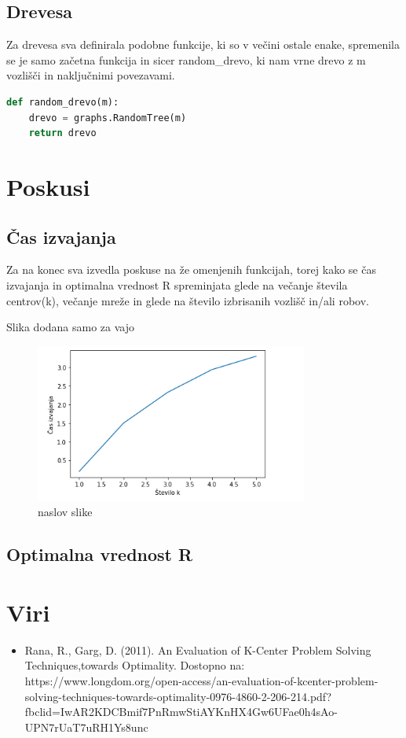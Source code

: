 \documentclass[a4paper]{article}
\begin{document}
\subsection{Drevesa}
Za drevesa sva definirala podobne funkcije, ki so v večini ostale enake, spremenila se je samo začetna funkcija in sicer random\_drevo, ki nam vrne drevo z m vozlišči in naključnimi povezavami.
\begin{lstlisting}[language=Python]
def random_drevo(m):
    drevo = graphs.RandomTree(m)
    return drevo
\end{lstlisting}

\section{Poskusi}
\subsection{Čas izvajanja}
Za na konec sva izvedla poskuse na že omenjenih funkcijah, torej kako se čas izvajanja in optimalna vrednost R spreminjata glede na večanje števila centrov(k), večanje mreže in glede na število izbrisanih vozlišč in/ali robov.


Slika dodana samo za vajo 
\begin{figure}
  \centering
  \includegraphics[width= 0.8\textwidth]{cas_od_k}
  \caption{naslov slike}
\end{figure}

\subsection{Optimalna vrednost R}






\section{Viri}

\begin{itemize}
\item Rana, R., Garg, D. (2011). An Evaluation of K-Center Problem Solving Techniques,towards Optimality. Dostopno na: https://www.longdom.org/open-access/an-evaluation-of-kcenter-problem-solving-techniques-towards-optimality-0976-4860-2-206-214.pdf?fbclid=IwAR2KDCBmif7PnRmwStiAYKnHX4Gw6UFae0h4sAo-UPN7rUaT7uRH1Ys8unc

\end{itemize}
\end{document}
